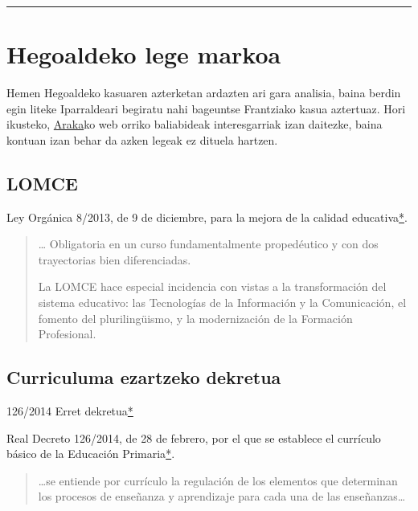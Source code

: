 \documentclass[
]{book}
\begin{document}
\begin{center}\rule{0.5\linewidth}{0.5pt}\end{center}

\hypertarget{hegoaldeko-lege-markoa}{%
\section{Hegoaldeko lege markoa}\label{hegoaldeko-lege-markoa}}

Hemen Hegoaldeko kasuaren azterketan ardazten ari gara analisia, baina berdin egin liteke Iparraldeari begiratu nahi bageuntse Frantziako kasua aztertuaz. Hori ikusteko, \href{http://www.vc.ehu.es/araka/orri12.htm}{Araka}ko web orriko baliabideak interesgarriak izan daitezke, baina kontuan izan behar da azken legeak ez dituela hartzen.

\hypertarget{lomce}{%
\subsection{LOMCE}\label{lomce}}

Ley Orgánica 8/2013, de 9 de diciembre, para la mejora de la calidad educativa\href{https://www.boe.es/buscar/act.php?id=BOE-A-2013-12886}{*}.

\begin{quote}
\ldots{} Obligatoria en un curso fundamentalmente propedéutico y con dos trayectorias bien diferenciadas.

La LOMCE hace especial incidencia con vistas a la transformación del sistema educativo: las Tecnologías de la Información y la Comunicación, el fomento del plurilingüismo, y la modernización de la Formación Profesional.
\end{quote}

\hypertarget{curriculuma-ezartzeko-dekretua}{%
\subsection{Curriculuma ezartzeko dekretua}\label{curriculuma-ezartzeko-dekretua}}

126/2014 Erret dekretua\href{https://www.boe.es/buscar/pdf/2014/BOE-A-2014-2222-consolidado.pdf}{*}

Real Decreto 126/2014, de 28 de febrero, por el que se establece el currículo básico de la Educación Primaria\href{https://www.boe.es/buscar/pdf/2014/BOE-A-2014-2222-consolidado.pdf}{*}.

\begin{quote}
\ldots se entiende por currículo la regulación de los elementos que determinan los procesos de enseñanza y aprendizaje para cada una de las enseñanzas\ldots{}
\end{quote}
\end{document}
